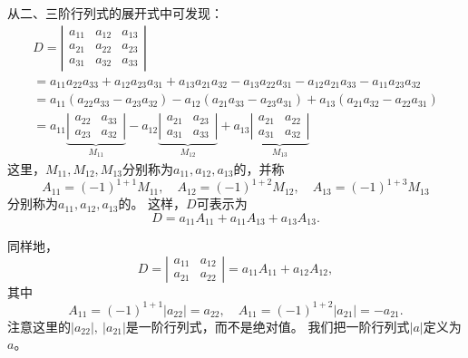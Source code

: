 从二、三阶行列式的展开式中可发现：
$$
\begin{array}{l}
  D  =  \left|
  \begin{array}{ccc}
    a_{11} & a_{12} & a_{13}\\
    a_{21} & a_{22} & a_{23}\\
    a_{31} & a_{32} & a_{33}
  \end{array}
                      \right| \\[0.6cm]
  = 
  a_{11}a_{22}a_{33}+a_{12}a_{23}a_{31}+a_{13}a_{21}a_{32}
  -a_{13}a_{22}a_{31}-a_{12}a_{21}a_{33}-a_{11}a_{23}a_{32} \\[0.3cm] 
  = 
  a_{11}(a_{22}a_{33}-a_{23}a_{32})-
  a_{12}(a_{21}a_{33}-a_{23}a_{31})+
  a_{13}(a_{21}a_{32}-a_{22}a_{31}) \\[0.3cm] 
  = 
  a_{11} \underbrace{\left| \begin{array}{ccc} a_{22} & a_{33} \\ a_{23} & a_{32} \end{array} \right|}_{M_{11}} -
                                                                           a_{12} \underbrace{\left| \begin{array}{ccc} a_{21} & a_{23} \\ a_{31} & a_{33} \end{array} \right|}_{M_{12}} +
                                                                                                                                                    a_{13} \underbrace{\left| \begin{array}{ccc} a_{21} & a_{22} \\ a_{31} & a_{32} \end{array} \right|}_{M_{13}}
\end{array}
$$
这里，$M_{11},M_{12},M_{13}$分别称为$a_{11},a_{12},a_{13}$的，并称
$$
A_{11} = (-1)^{1+1} M_{11}, \quad
A_{12} = (-1)^{1+2} M_{12}, \quad
A_{13} = (-1)^{1+3} M_{13}
$$
分别称为$a_{11},a_{12},a_{13}$的。 这样，$D$可表示为
$$
D= a_{11}A_{11} + a_{11}A_{13} + a_{13}A_{13}.
$$

同样地，
$$
D = \left| \begin{array}{ccc} a_{11} & a_{12} \\ a_{21} & a_{22} \end{array} \right|
= a_{11} A_{11} + a_{12} A_{12},
$$
其中
$$
A_{11} = (-1)^{1+1}|a_{22}| =  a_{22},\quad
A_{11} = (-1)^{1+2}|a_{21}| = -a_{21}.
$$
注意这里的$|a_{22}|,~|a_{21}|$是一阶行列式，而不是绝对值。
我们把一阶行列式$|a|$定义为$a$。


